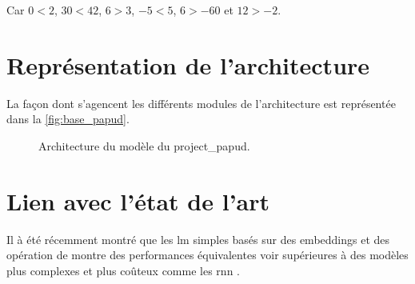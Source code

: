 Car $0<2$, $30<42$, $6>3$, $-5<5$, $6>-60$ et $12>-2$.

\section{Représentation de l'architecture}

La façon dont s'agencent les différents modules de l'architecture est représentée dans la \autoref{fig:base_papud}.

\begin{figure}[ht]
	\centering
	
	\caption[Architecture du modèle du projet PAPUD]{Architecture du modèle du \gls{project_papud}.}
	\label{fig:base_papud}
\end{figure}

\section{Lien avec l'état de l'art}
Il à été récemment montré que les \gls{lm} simples basés sur des  \glspl{embedding} et des opération de 
montre des performances équivalentes voir supérieures à des modèles plus complexes et plus coûteux comme les \gls{rnn} \autocite{pooling_simple}.

%
%
%
%
%
